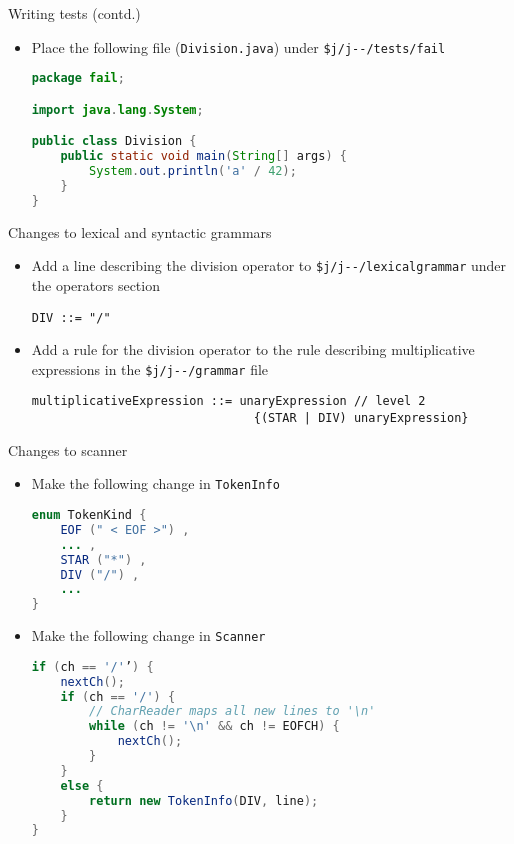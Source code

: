 \documentclass[8pt,a4paper,compress]{beamer}
\begin{document}
\begin{frame}[fragile]
\pause

Writing tests (contd.)
\begin{itemize}
\item Place the following file (\lstinline{Division.java}) under \lstinline{$j/j--/tests/fail}

\begin{lstlisting}[language=Java]
package fail;

import java.lang.System;

public class Division {
    public static void main(String[] args) {
        System.out.println('a' / 42);
    }
}
\end{lstlisting}
\end{itemize}

\pause
\bigskip

Changes to lexical and syntactic grammars
\begin{itemize}
\item Add a line describing the division operator to \lstinline{$j/j--/lexicalgrammar} under the operators section

\begin{lstlisting}[language={}]
DIV ::= "/"
\end{lstlisting}

\item Add a rule for the division operator to the rule describing multiplicative expressions in the \lstinline{$j/j--/grammar} file

\begin{lstlisting}[language={}]
multiplicativeExpression ::= unaryExpression // level 2
                               {(STAR | DIV) unaryExpression}
\end{lstlisting}
\end{itemize}
\end{frame}

\begin{frame}[fragile]
\pause

Changes to scanner
\begin{itemize}
\item Make the following change in \lstinline{TokenInfo}

\begin{lstlisting}[language=Java]
enum TokenKind {
    EOF (" < EOF >") ,
    ... ,
    STAR ("*") ,
    DIV ("/") ,
    ...
}
\end{lstlisting}

\item Make the following change in \lstinline{Scanner}

\begin{lstlisting}[language=Java]
if (ch == '/'’) {
    nextCh();
    if (ch == '/') {
        // CharReader maps all new lines to '\n'
        while (ch != '\n' && ch != EOFCH) {
            nextCh();
        }
    }
    else {
        return new TokenInfo(DIV, line);
    }
}
\end{lstlisting}
\end{itemize}
\end{frame}
\end{document}
